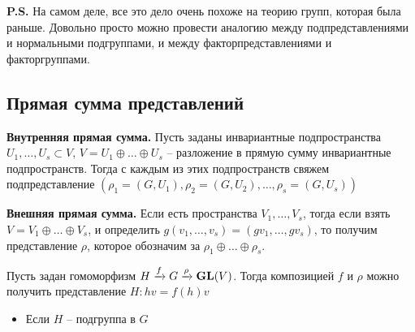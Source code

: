 {\bf P.S.} На самом деле, все это дело очень похоже на теорию групп, которая была раньше. Довольно просто можно провести аналогию между подпредставлениями и нормальными подгруппами, и между факторпредставлениями и факторгруппами.

\subsection{Прямая сумма представлений}
{\bf Внутренняя прямая сумма.} Пусть заданы инвариантные подпространства $U_1, \ldots, U_s \subset V$, $V = U_1 \oplus \ldots \oplus U_s$ -- разложение в прямую сумму инвариантные подпространств. Тогда с каждым из этих подпространств свяжем подпредставление $(\rho_1 = (G, U_1), \rho_2 = (G, U_2), \ldots , \rho_s = (G, U_s))$ 

{\bf Внешняя прямая сумма.} Если есть пространства $V_1, \ldots, V_s$, тогда если взять $V = V_1 \oplus \ldots \oplus V_s$, и определить $g(v_1, \ldots, v_s) = (gv_1, \ldots, gv_s)$, то получим представление $\rho$, которое обозначим за $\rho_1 \oplus \ldots \oplus \rho_s$.

Пусть задан гомоморфизм $H \xrightarrow{f} G \xrightarrow{\rho} \mathbf{GL}(V)$. Тогда композицией $f$ и $\rho$ можно получить представление $H: hv = f(h)v$
	
\begin{itemize}
	\item Если $H$ -- подгруппа в $G$
\end{itemize}